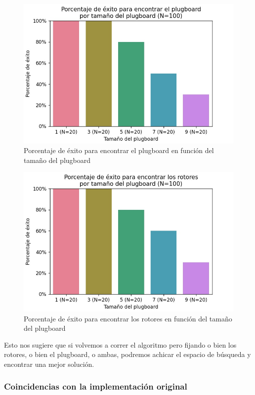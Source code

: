 \documentclass[a4paper,10pt]{article}
\begin{document}
\begin{figure}[H]
    \centering
    \includegraphics[scale=0.8]{plugboard_success.jpg}
    \caption{Porcentaje de éxito para encontrar el plugboard en función del tamaño del plugboard}
    \label{fig:my_label}
\end{figure}

\begin{figure}[H]
    \centering
    \includegraphics[scale=0.8]{rotor_order_success.jpg}
    \caption{Porcentaje de éxito para encontrar los rotores en función del tamaño del plugboard}
    \label{fig:my_label}
\end{figure}

Esto nos sugiere que si volvemos a correr el algoritmo pero fijando o bien los rotores, o bien el plugboard, o ambas, podremos achicar el espacio de búsqueda y encontrar una mejor solución.

\subsubsection{Coincidencias con la implementación original}
\end{document}
